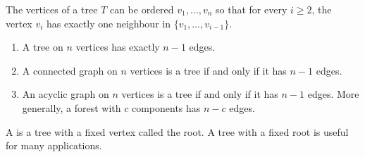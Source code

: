 \documentclass[8pt,a4paper,landscape]{extarticle}
\begin{document}
\begin{cscolumns}
\begin{theorem}[Proposition]
The vertices of a tree $T$ can be ordered $v_1,\dots,v_n$ so that for every $i\ge 2$, the vertex $v_i$ has exactly one neighbour in $\{v_1,\dots,v_{i-1}\}$.
\end{theorem}
\begin{theorem}[Corollary]
\begin{enumerate}[label=\arabic*.]
\item A tree on $n$ vertices has exactly $n-1$ edges.
\item A connected graph on $n$ vertices is a tree if and only if it has $n-1$ edges.
\item An acyclic graph on $n$ vertices is a tree if and only if it has $n-1$ edges. More generally, a forest with $c$ components has $n-c$ edges.
\end{enumerate}
\end{theorem}
\begin{definition}
A  is a tree with a fixed vertex called the root. A tree with a fixed root is useful for many applications.
\end{definition}


\end{cscolumns}
\end{document}
